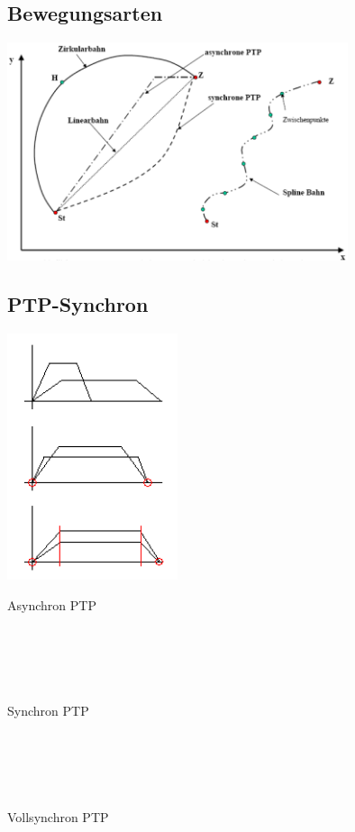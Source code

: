 	\subsection{Bewegungsarten}
		\includegraphics[width=10cm]{./bilder/bewegungsarten.png}
	
	\subsection{PTP-Synchron}
	\begin{minipage}{6cm}
		\includegraphics[width=5cm]{./bilder/synchron.png}
    \end{minipage}
	\begin{minipage}{12.5cm}
    	Asynchron PTP\\ \\ \\ \\ \\ \\
    	Synchron PTP\\ \\ \\ \\ \\ \\
    	Vollsynchron PTP\\
    \end{minipage}

